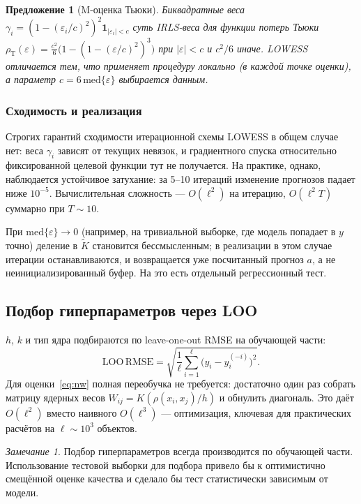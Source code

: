 \documentclass[12pt,a4paper]{article}
\newtheorem{proposition}{Предложение}
\theoremstyle{definition}
\theoremstyle{remark}
\newtheorem{remark}{Замечание}
\begin{document}
\begin{proposition}[M-оценка Тьюки]
Биквадратные веса
$\gamma_{i}=(1-(\varepsilon_{i}/c)^{2})^{2}\mathbf{1}_{|\varepsilon_{i}|<c}$
суть IRLS-веса для функции потерь Тьюки
$\rho_{\mathrm{T}}(\varepsilon)=\tfrac{c^{2}}{6}\bigl(1-(1-(\varepsilon/c)^{2})^{3}\bigr)$
при $|\varepsilon|<c$ и $c^{2}/6$ иначе. LOWESS отличается тем, что
применяет процедуру локально (в каждой точке оценки), а параметр
$c=6\,\mathrm{med}\{\varepsilon\}$ выбирается данным.
\end{proposition}

\subsubsection{Сходимость и реализация}

Строгих гарантий сходимости итерационной схемы LOWESS в общем случае нет:
веса $\gamma_{i}$ зависят от текущих невязок, и градиентного спуска
относительно фиксированной целевой функции тут не получается. На практике,
однако, наблюдается устойчивое затухание: за 5--10 итераций изменение
прогнозов падает ниже $10^{-5}$. Вычислительная сложность ---
$O(\ell^{2})$ на итерацию, $O(\ell^{2}T)$ суммарно при $T\sim 10$.

При $\mathrm{med}\{\varepsilon\}\to 0$ (например, на тривиальной выборке,
где модель попадает в $y$ точно) деление в $\widetilde K$ становится
бессмысленным; в реализации в этом случае итерации останавливаются, и
возвращается уже посчитанный прогноз $a$, а не неинициализированный буфер.
На это есть отдельный регрессионный тест.

\subsection{Подбор гиперпараметров через LOO}

$h$, $k$ и тип ядра подбираются по leave-one-out RMSE на обучающей части:
\[
    \mathrm{LOO}\,\mathrm{RMSE}=
    \sqrt{\frac{1}{\ell}\sum_{i=1}^{\ell}\bigl(y_{i}-\hat y_{i}^{(-i)}\bigr)^{2}}.
\]
Для оценки~\eqref{eq:nw} полная переобучка не требуется: достаточно один
раз собрать матрицу ядерных весов $W_{ij}=K(\rho(x_{i},x_{j})/h)$ и обнулить
диагональ. Это даёт $O(\ell^{2})$ вместо наивного $O(\ell^{3})$ ---
оптимизация, ключевая для практических расчётов на $\ell\sim 10^{3}$ объектов.

\begin{remark}
Подбор гиперпараметров всегда производится по обучающей части. Использование
тестовой выборки для подбора привело бы к оптимистично смещённой оценке
качества и сделало бы тест статистически зависимым от модели.
\end{remark}
\end{document}
